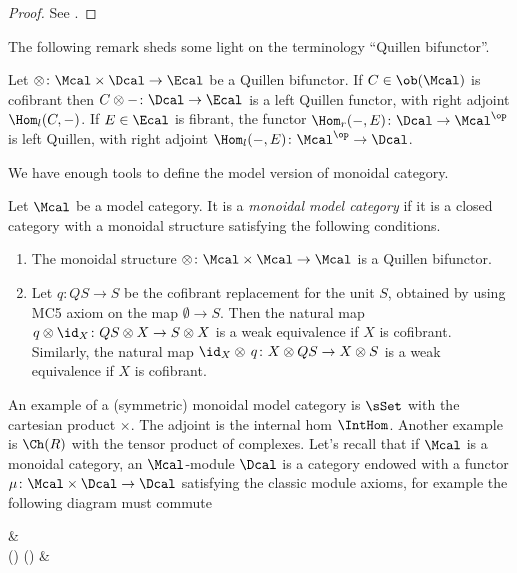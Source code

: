         \begin{proof}
            See \cite[Lemma~4.2.2]{Hov:model}.
        \end{proof}
        The following remark sheds some light on the terminology ``Quillen bifunctor''.
        \begin{remark}
            Let $\otimes\colon \Mcal \times \Dcal \to \Ecal$ be a Quillen bifunctor. If $C \in \ob(\Mcal)$ is cofibrant then $C \otimes -\colon \Dcal \to \Ecal$ is a left Quillen functor, with right adjoint $\Hom_l(C, -)$. If $E \in \Ecal$ is fibrant, the functor $\Hom_r(-, E)\colon \Dcal \to \Mcal^{\op}$ is left Quillen, with right adjoint $\Hom_l(-, E)\colon \Mcal^{\op} \to \Dcal$.
        \end{remark}

        We have enough tools to define the model version of monoidal category.
        \begin{defn}
            \label{defn:monoidal_model_categories}
            Let $\Mcal$ be a model category. It is a \emph{monoidal model category} if it is a closed category with a monoidal structure satisfying the following conditions.
            \begin{enumerate}
                \item The monoidal structure $\otimes\colon \Mcal \times \Mcal \to \Mcal$ is a Quillen bifunctor.
                \item Let $q\colon QS \to S$ be the cofibrant replacement for the unit $S$, obtained by using MC5 axiom on the map $\emptyset \to S$. Then the natural map $q \otimes \id_X\colon QS \otimes X \to S \otimes X$ is a weak equivalence if $X$ is cofibrant. Similarly, the natural map $\id_X \otimes\,q \colon X \otimes QS \to X \otimes S$ is a weak equivalence if $X$ is cofibrant.
            \end{enumerate}
        \end{defn}
        An example of a (symmetric) monoidal model category is $\sSet$ with the cartesian product $\times$. The adjoint is the internal hom $\IntHom$.
        Another example is $\Ch(R)$ with the tensor product of complexes.
        Let's recall that if $\Mcal$ is a monoidal category, an $\Mcal$-module $\Dcal$ is a category endowed with a functor $\mu\colon \Mcal \times \Dcal \to \Dcal$ satisfying the classic module axioms, for example the following diagram must commute
        \begin{diag}
            \Mcal \times \Dcal \ar[r, "\mu"] & \Dcal \\
            (\Mcal \times \Mcal) \times \Dcal \simeq \Mcal \times (\Mcal \times \Dcal)   & \Mcal \times \Dcal \ar[u, "\mu"]
        \end{diag}

